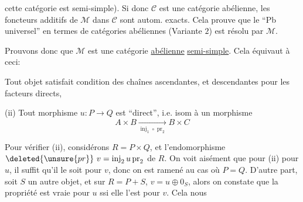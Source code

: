 
cette catégorie est semi-simple). Si donc \(\mathcal C\) est
une catégorie abélienne, les foncteurs additifs
de \(\mathcal M\) dans \(\mathcal C\) sont autom. exacts. Cela
prouve que le ``Pb universel'' 
en termes
de catégories abéliennes (Variante \(2\)) est
résolu par \(\mathcal M\).

Prouvons donc que \(\mathcal M\) est une catégorie
\uline{abélienne} \uline{semi-simple}. Cela équivaut à ceci:

 Tout objet  satisfait condition des chaînes ascendantes,
et descendantes pour les  facteurs directs,

(ii) Tout morphisme \(u:P\longrightarrow Q\) est ``direct'',
i.e. isom à un morphisme
\[
A\times B\xrightarrow[\operatorname{inj}_1\circ\operatorname{pr}_2]{}B\times C
\]

Pour vérifier (ii),  considérons \(R=P\times Q\),
et l'endomorphisme \(\deleted{\unsure{pr}}\ v=\operatorname{inj}_2u\operatorname{pr}_2\) de \(R\).
On voit aisément que pour  (ii) 
pour \(u\),
il \inserted{\(^{(*)}\)} suffit  qu'il le soit pour \(v\), donc on
est ramené au cas où \(P=Q\). D'autre part,
soit  \(S\) un autre objet, et sur
\(R=P+S\), \(v=u\oplus0_S\), alors on constate que la
propriété est vraie pour \(u\) ssi elle l'est pour \(v\). Cela nous

